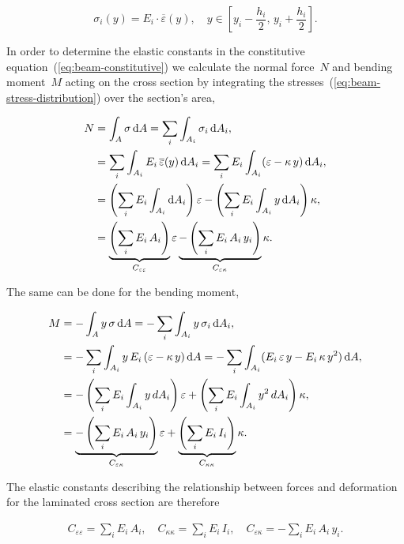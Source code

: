 \begin{equation}
\sigma_i(y) = E_i\cdot\overline{\varepsilon}(y),\quad y \in [y_i - \frac{h_i}{2},\,y_i + \frac{h_i}{2}].\label{eq:beam-stress-distribution}
\end{equation}

In order to determine the elastic constants in the constitutive equation~(\ref{eq:beam-constitutive}) we calculate the normal force~$N$ and bending moment~$M$ acting on the cross section by integrating the stresses~(\ref{eq:beam-stress-distribution}) over the section's area,

\begin{align}
N &= \int_A \sigma\,\mathrm{d}A = \sum_i\int_{A_i}\sigma_i\,\mathrm{d}A_i,\notag\\
&= \sum_i\int_{A_i}E_i\,\overline{\varepsilon}(y)\,\mathrm{d}A_i = \sum_i E_i \int_{A_i}(\varepsilon - \kappa\,y)\,\mathrm{d}A_i,\notag\\
&= \left(\sum_i E_i\int_{A_i}\mathrm{d}A_i\right)\varepsilon - \left(\sum_i E_i\int_{A_i}y\,\mathrm{d}A_i\right)\kappa,\notag\\
&=
\underbrace{
\left(\sum_i E_i\,A_i\right)
}_{C_{\varepsilon\varepsilon}}
\varepsilon
\underbrace{
- \left(\sum_i E_i\,A_i\,y_i\right)
}_{C_{\varepsilon\kappa}}
\kappa.\label{eq:elements:beam:constitutive_1}
\end{align}

The same can be done for the bending moment,

\begin{align}
M &= -\int_A y\,\sigma\,\mathrm{d}A = -\sum_i\int_{A_i}y\,\sigma_i\,\mathrm{d}A_i,\notag\\
&= -\sum_i\int_{A_i}y\,E_i\,(\varepsilon - \kappa\,y)\,\mathrm{d}A = -\sum_i\int_{A_i}(E_i\,\varepsilon\,y - E_i\,\kappa\,y^2)\,\mathrm{d}A,\notag\\
&= -\left(\sum_i E_i\int_{A_i}y\,dA_{i}\right)\varepsilon + \left(\sum_i E_i\int_{A_i}y^2\,dA_i\right)\kappa,\notag\\
&=
\underbrace{
-\left(\sum_i E_i\,A_i\,y_i\right)
}_{C_{\varepsilon\kappa}}
\varepsilon +
\underbrace{
\left(\sum_i E_i\,I_{i}\right)
}_{C_{\kappa\kappa}}
\kappa.\label{eq:elements:beam:constitutive_2}
\end{align}

The elastic constants describing the relationship between forces and deformation for the laminated cross section are therefore

\begin{align}
C_{\varepsilon\varepsilon} = \sum_i E_i\,A_i,\quad
C_{\kappa\kappa} = \sum_i E_i\,I_{i},\quad
C_{\varepsilon\kappa} = -\sum_i E_i\,A_i\,y_i.
\end{align}

